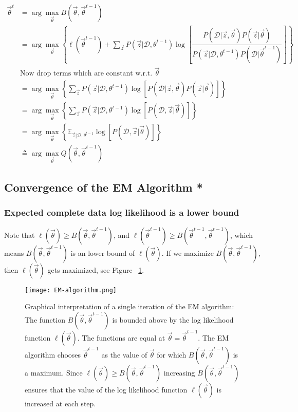 \begin{align}
\vec{\theta}^t &= \arg\max\limits_{\vec{\theta}} B(\vec{\theta},\vec{\theta}^{t-1})  \nonumber \\
                &= \arg\max\limits_{\vec{\theta}}{\left\{ \ell(\vec{\theta}^{t-1})+\sum\limits_{\vec{z}} P(\vec{z}|\mathcal{D},\theta^{t-1})\log\left[\dfrac{P(\mathcal{D}|\vec{z},\vec{\theta})P(\vec{z}|\vec{\theta})}{P(\vec{z}|\mathcal{D},\theta^{t-1})P(\mathcal{D}|\vec{\theta}^{t-1})}\right]\right\}} \nonumber \\
				& \text{Now drop terms which are constant w.r.t. } \vec{\theta} \nonumber \\
				&= \arg\max\limits_{\vec{\theta}}{\left\{\sum\limits_{\vec{z}} P(\vec{z}|\mathcal{D},\theta^{t-1})\log\left[P(\mathcal{D}|\vec{z},\vec{\theta})P(\vec{z}|\vec{\theta})\right]\right\}} \nonumber \\
				&= \arg\max\limits_{\vec{\theta}}{\left\{\sum\limits_{\vec{z}} P(\vec{z}|\mathcal{D},\theta^{t-1})\log\left[P(\mathcal{D},\vec{z}|\vec{\theta})\right]\right\}} \nonumber \\
				&= \arg\max\limits_{\vec{\theta}}{\left\{\mathbb{E}_{\vec{z}|\mathcal{D},\theta^{t-1}}\log\left[P(\mathcal{D},\vec{z}|\vec{\theta})\right]\right\}} \\
				&\triangleq \arg\max\limits_{\vec{\theta}}{Q(\vec{\theta}, \vec{\theta}^{t-1})}
\end{align}


\subsection{Convergence of the EM Algorithm *}

\subsubsection{Expected complete data log likelihood is a lower bound}

Note that $\ell(\vec{\theta}) \geq B(\vec{\theta},\vec{\theta}^{t-1})$, and $\ell(\vec{\theta}^{t-1}) \geq B(\vec{\theta}^{t-1},\vec{\theta}^{t-1})$, which means $B(\vec{\theta},\vec{\theta}^{t-1})$ is an lower bound of $\ell(\vec{\theta})$. If we maximize $B(\vec{\theta},\vec{\theta}^{t-1})$, then $\ell(\vec{\theta})$ gets maximized, see Figure ~\ref{fig:EM-algorithm}.

\begin{figure}[hbtp]
\centering
    \texttt{[image: EM-algorithm.png]}
\caption{Graphical interpretation of a single iteration of the EM algorithm: The function $B(\vec{\theta},\vec{\theta}^{t-1})$ is bounded above by the log likelihood function $\ell(\vec{\theta})$. The functions are equal at $\vec{\theta} = \vec{\theta}^{t-1}$. The EM algorithm chooses $\vec{\theta}^{t-1}$ as the value of $\vec{\theta}$ for which $B(\vec{\theta},\vec{\theta}^{t-1})$ is a maximum. Since $\ell(\vec{\theta}) \geq B(\vec{\theta},\vec{\theta}^{t-1})$ increasing $B(\vec{\theta},\vec{\theta}^{t-1})$ ensures that the value of the log likelihood function $\ell(\vec{\theta})$ is increased at each step.}
\label{fig:EM-algorithm} 
\end{figure}

